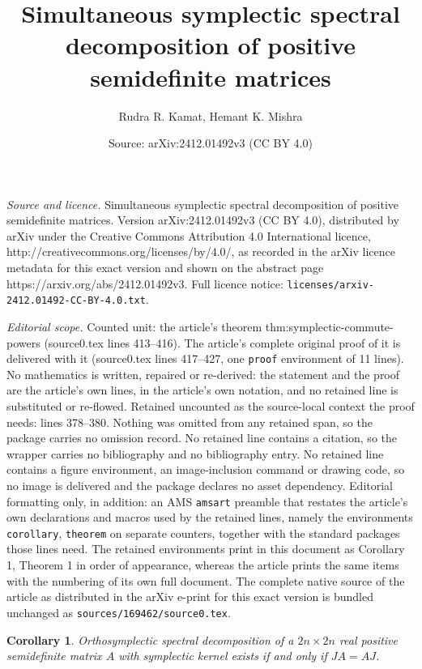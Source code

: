 \documentclass[10pt,a4paper]{amsart}
\title{Simultaneous symplectic spectral decomposition of positive semidefinite matrices}
\author{Rudra R. Kamat, Hemant K. Mishra}
\date{Source: arXiv:2412.01492v3 (CC BY 4.0)}
\newtheorem{corollary}{Corollary}
\begin{document}
\maketitle

\noindent\emph{Source and licence.} Simultaneous symplectic spectral decomposition of positive semidefinite matrices. Version arXiv:2412.01492v3 (CC BY 4.0), distributed by arXiv under the Creative Commons Attribution 4.0 International licence, http://creativecommons.org/licenses/by/4.0/, as recorded in the arXiv licence metadata for this exact version and shown on the abstract page https://arxiv.org/abs/2412.01492v3. Full licence notice: \texttt{licenses/arxiv-2412.01492-CC-BY-4.0.txt}.\par\smallskip

\noindent\textit{Editorial scope.} Counted unit: the article's theorem thm:symplectic-commute-powers (source0.tex lines 413--416). The article's complete original proof of it is delivered with it (source0.tex lines 417--427, one \texttt{proof} environment of 11 lines). No mathematics is written, repaired or re-derived: the statement and the proof are the article's own lines, in the article's own notation, and no retained line is substituted or re-flowed.  Retained uncounted as the source-local context the proof needs: lines 378--380.  Nothing was omitted from any retained span, so the package carries no omission record.  No retained line contains a citation, so the wrapper carries no bibliography and no bibliography entry.  No retained line contains a figure environment, an image-inclusion command or drawing code, so no image is delivered and the package declares no asset dependency.  Editorial formatting only, in addition: an AMS \texttt{amsart} preamble that restates the article's own declarations and macros used by the retained lines, namely the environments \texttt{corollary}, \texttt{theorem} on separate counters, together with the standard packages those lines need.  The retained environments print in this document as Corollary 1, Theorem 1 in order of appearance, whereas the article prints the same items with the numbering of its own full document.  The complete native source of the article as distributed in the arXiv e-print for this exact version is bundled unchanged as \texttt{sources/169462/source0.tex}.
    \begin{corollary}\label{cor:orthosymplectic-diagonalization-williamson}
        Orthosymplectic spectral decomposition of a $2n \times 2n$ real positive semidefinite matrix $A$ with symplectic kernel exists if and only if $JA=AJ$.
    \end{corollary}
\end{document}
